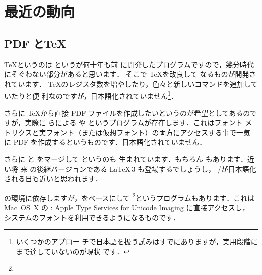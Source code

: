 \chapter{最近の動向}

\begin{abstract}
 \TeX の世界も熱狂的な方々が各々の改良や研究をされているので，日々進
 歩しています．それらの開発・発展を見逃していると，せっかく便利なプログラム
 やパッケージが公開されていながらもったいない事になりかねません．ですから，
 このページでは主に\genzai  \TeX 周辺で発展している便利なツールやパッ
 ケージを紹介します．
\end{abstract}


\section{PDF と\TeX}

\TeX というのは  というが何十年も前
に開発したプログラムですので，幾分時代にそぐわない部分があると思います．
そこで \TeX を改良して \Prog[eTeX]{\eTeX} なるものが開発されています．
\TeX のレジスタ数を増やしたり，色々と新しいコマンドを追加していたりと便
利なのですが，\genzai 日本語化されていません\footnote{いくつかのアプロー
チで日本語を扱う試みはすでにありますが，実用段階にまで達していないのが現状
です．}．

さらに \TeX から直接 PDF ファイルを作成したいというのが希望としてあるので
すが，実際に らによる \Prog[PDFTeX]{\PDFTeX} や
\Prog[PDFlatex]{\PDFLaTeX} というプログラムが存在します．これはフォント
メトリクスと実フォント（または仮想フォント）の両方にアクセスする事で一気
に PDF を作成するというものです．\genzai 日本語化されていません．

%
さらに \eTeX と \PDFTeX をマージして \Prog[PDFeTeX]{\PDFeTeX} というのも
生まれています．もちろん \Prog[PDFeLaTeX]{\PDFeLaTeX} もあります．近い将
来 \LaTeXe の後継バージョンである \LaTeX\,3 も登場するでしょうし，
\eTeX/\PDFTeX が日本語化される日も近いと思われます．

%
の環境に依存しますが，\PDFeTeX をベースにして
\Prog[XeTeX]{\XeTeX}\footnote{\webXeTeX}というプログラムもあります．これは Mac~OS~X の
: Apple Type Services for Unicode Imaging に直接アクセスし，
システムのフォントを利用できるようになるものです．

